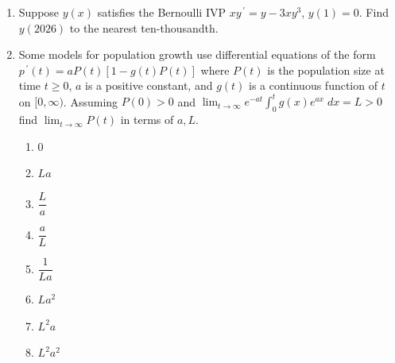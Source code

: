 \documentclass{ximera}
\begin{document}
\begin{enumerate}[label=(\arabic*)]





\item Suppose $y(x)$ satisfies the Bernoulli IVP $xy^{\,\prime}=y-3xy^3$, $y(1)=0$.  Find $y(2026)$ to the nearest ten-thousandth.


\newpage

\item Some models for population growth use differential equations of the form $p^{\,\prime}(t)=aP(t)\left[1-g(t)P(t)\right]$ where $P(t)$ is the population size at time $t\geq 0$, $a$ is a positive constant, and $g(t)$ is a continuous function of $t$ on $[0,\infty)$.  Assuming $P(0)>0$ and $\displaystyle \lim_{t\rightarrow \infty} e^{-at} \int_0^t g(x)e^{ax}\;dx=L>0$ find $\displaystyle \lim_{t\rightarrow\infty} P(t)$ in terms of $a,L$.







 \begin{enumerate}[label=(\alph*)]
    \item $0$
	\item $La$
	\item $\dfrac{L}{a}$
	\item $\dfrac{a}{L}$
	\item $\dfrac{1}{La}$ %
	\item $La^2$
	\item $L^2a$
    \item $L^2a^2$
\end{enumerate}


\end{enumerate}
\end{document}
